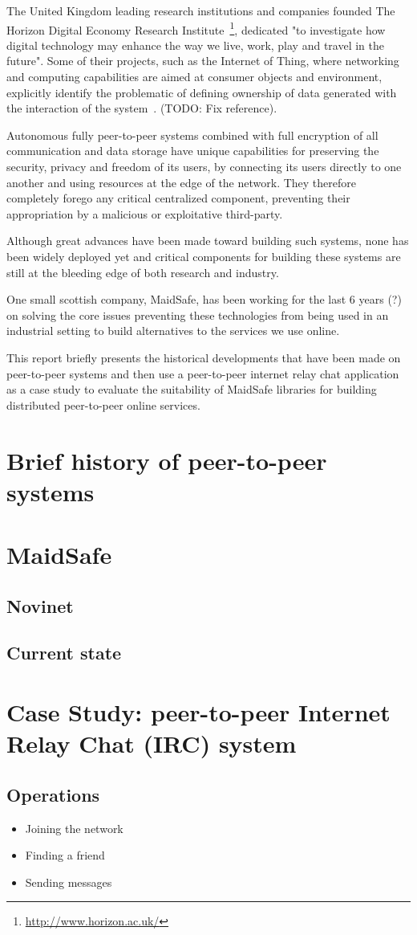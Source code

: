 The United Kingdom leading research institutions and companies founded The Horizon Digital Economy Research Institute~\footnote{\url{http://www.horizon.ac.uk/}}, dedicated "to investigate how digital technology may enhance the way we live, work, play and travel in the future". Some of their projects, such as the Internet of Thing, where networking and computing capabilities are aimed at consumer objects and environment, explicitly identify the problematic of defining ownership of data generated with the interaction of the system~\cite{HorizonIoTChallenges:2013}. (TODO: Fix reference).

Autonomous fully peer-to-peer systems combined with full encryption of all communication and data storage have unique capabilities for preserving the security, privacy and freedom of its users, by connecting its users directly to one another and using resources at the edge of the network. They therefore completely forego any critical centralized component, preventing their appropriation by a malicious or exploitative third-party.

Although great advances have been made toward building such systems, none has been widely deployed yet and critical components for building these systems are still at the bleeding edge of both research and industry. 

One small scottish company, MaidSafe, has been working for the last 6 years (?) on solving the core issues preventing these technologies from being used in an industrial setting to build alternatives to the services we use online.  

This report briefly presents the historical developments that have been made on peer-to-peer systems and then use a peer-to-peer internet relay chat application as a case study to evaluate the suitability of MaidSafe libraries for building distributed peer-to-peer online services.


\section{Brief history of peer-to-peer systems}

\section{MaidSafe}

\subsection{Novinet}

\subsection{Current state}

\section{Case Study: peer-to-peer Internet Relay Chat (IRC) system}

\subsection{Operations}
\begin{itemize}
	\item Joining the network
	\item Finding a friend
	\item Sending messages
\end{itemize}
